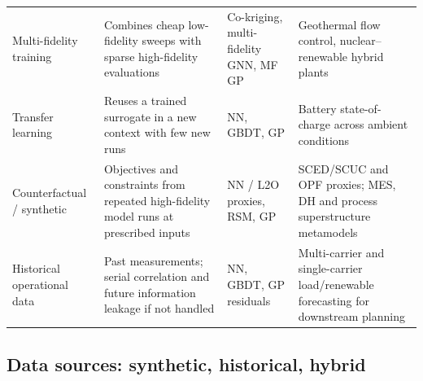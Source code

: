 \begin{table}[!t]
\begin{tabularx}{\textwidth}{@{}L{0.18\textwidth} L{0.30\textwidth} L{0.20\textwidth} L{0.26\textwidth}@{}}
    Multi-fidelity training
      & Combines cheap low-fidelity sweeps with sparse high-fidelity evaluations
      & Co-kriging, multi-fidelity GNN, MF GP
      & Geothermal flow control, nuclear--renewable hybrid plants
        \cite{Chen2025244,Chung2023} \\
    Transfer learning
      & Reuses a trained surrogate in a new context with few new runs
      & NN, GBDT, GP
      & Battery state-of-charge across ambient conditions
        \cite{Chen202514792} \\
    Counterfactual / synthetic
      & Objectives and constraints from repeated high-fidelity model runs at prescribed inputs
      & NN / L2O proxies, RSM, GP
      & SCED/SCUC and OPF proxies; MES, DH and process superstructure metamodels
        \cite{Liu20223726,Wu2022231,Liu201914569,Sánchez-Zabala2024,Granacher20221573} \\
    Historical operational data
      & Past measurements; serial correlation and future information leakage if not handled
      & NN, GBDT, GP residuals
      & Multi-carrier and single-carrier load/renewable forecasting for downstream planning
        \cite{Shi2024__2,Dong2024,Koschwitz2018134,Bianchi2020244,Eseye201991463} \\
    \bottomrule
  \end{tabularx}
\end{table}

\subsection{Data sources: synthetic, historical, hybrid}
\label{sec:doe:sources}

